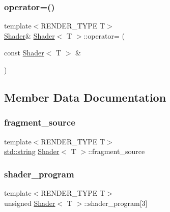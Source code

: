 \mbox{\label{classShader_a58f724fecccecdb1633e08ce0258da37}} 
\subsubsection{\texorpdfstring{operator=()}{operator=()}\hspace{0.1cm}{\footnotesize\ttfamily [2/2]}}
{\footnotesize\ttfamily template$<$R\+E\+N\+D\+E\+R\+\_\+\+T\+Y\+PE T$>$ \\
\mbox{\hyperlink{classShader}{Shader}}\& \mbox{\hyperlink{classShader}{Shader}}$<$ T $>$\+::operator= (\begin{DoxyParamCaption}\item[{const \mbox{\hyperlink{classShader}{Shader}}$<$ T $>$ \&}]{ }\end{DoxyParamCaption})\hspace{0.3cm}{\ttfamily [delete]}}



\subsection{Member Data Documentation}
\mbox{\label{classShader_afe4fa217dd3f5d201b6a5a4c7fd784be}} 
\subsubsection{\texorpdfstring{fragment\+\_\+source}{fragment\_source}}
{\footnotesize\ttfamily template$<$R\+E\+N\+D\+E\+R\+\_\+\+T\+Y\+PE T$>$ \\
\mbox{\hyperlink{glad_8h_ac83513893df92266f79a515488701770}{std\+::string}} \mbox{\hyperlink{classShader}{Shader}}$<$ T $>$\+::fragment\+\_\+source\hspace{0.3cm}{\ttfamily [protected]}}

\mbox{\label{classShader_af8ec4edd2b1b56f32ce416280ff9b9e1}} 
\subsubsection{\texorpdfstring{shader\+\_\+program}{shader\_program}}
{\footnotesize\ttfamily template$<$R\+E\+N\+D\+E\+R\+\_\+\+T\+Y\+PE T$>$ \\
unsigned \mbox{\hyperlink{classShader}{Shader}}$<$ T $>$\+::shader\+\_\+program\mbox{[}3\mbox{]}\hspace{0.3cm}{\ttfamily [protected]}}

